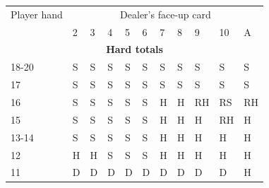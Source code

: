 \documentclass[conference]{IEEEtran}
\begin{document}
\begin{table}[ht]
\tiny
\centering
\begin{tabular}{|l|l|l|l|l|l|l|l|l|l|l|}
\hline

{Player hand} & \multicolumn{10}{c|}{Dealer's face-up card}     \\ \cline{2-11} 
                             & 2 & 3 & 4 & 5 & 6 & 7 & 8 & 9 & 10 & A \\ \hline
\multicolumn{11}{|c|}{\textbf{Hard totals}}                           \\ \hline
18-20       								 & \cellcolor{red!75}S & \cellcolor{red!75}S & \cellcolor{red!75}S & \cellcolor{red!75}S & \cellcolor{red!75}S & \cellcolor{red!75}S & \cellcolor{red!75}S & \cellcolor{red!75}S & \cellcolor{red!75}S & \cellcolor{red!75}S  \\ \hline
17                           & \cellcolor{red!75}S & \cellcolor{red!75}S & \cellcolor{red!75}S & \cellcolor{red!75}S & \cellcolor{red!75}S & \cellcolor{red!75}S & \cellcolor{red!75}S & \cellcolor{red!75}S & \cellcolor{red!75}S & \cellcolor{red!75}S  \\ \hline
16                           & \cellcolor{red!75}S & \cellcolor{red!75}S & \cellcolor{red!75}S & \cellcolor{red!75}S & \cellcolor{red!75}S & \cellcolor{green!50}H & \cellcolor{green!50}H & \cellcolor{magenta!80}RH & \cellcolor{magenta!80}RS & \cellcolor{magenta!80}RH  \\ \hline
15                           & \cellcolor{red!75}S & \cellcolor{red!75}S & \cellcolor{red!75}S & \cellcolor{red!75}S & \cellcolor{red!75}S & \cellcolor{green!50}H & \cellcolor{green!50}H & \cellcolor{green!50}H & \cellcolor{magenta!80}RH & \cellcolor{green!50}H  \\ \hline
13-14                        & \cellcolor{red!75}S & \cellcolor{red!75}S & \cellcolor{red!75}S & \cellcolor{red!75}S & \cellcolor{red!75}S & \cellcolor{green!50}H & \cellcolor{green!50}H & \cellcolor{green!50}H & \cellcolor{green!50}H & \cellcolor{green!50}H  \\ \hline
12                           & \cellcolor{green!50}H & \cellcolor{green!50}H & \cellcolor{red!75}S & \cellcolor{red!75}S & \cellcolor{red!75}S & \cellcolor{green!50}H & \cellcolor{green!50}H & \cellcolor{green!50}H & \cellcolor{green!50}H & \cellcolor{green!50}H  \\ \hline
11                           & \cellcolor{blue!25}D & \cellcolor{blue!25}D & \cellcolor{blue!25}D & \cellcolor{blue!25}D & \cellcolor{blue!25}D & \cellcolor{blue!25}D & \cellcolor{blue!25}D & \cellcolor{blue!25}D & \cellcolor{blue!25}D & \cellcolor{green!50}H  \\ \hline

\end{tabular}
\end{table}
\end{document}
